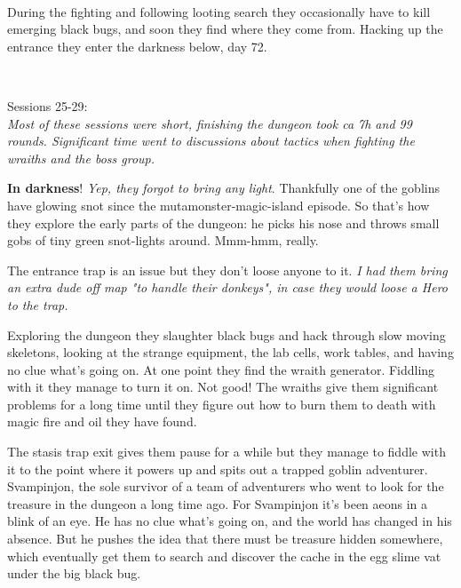 \

During the fighting and following looting search they occasionally have to kill emerging black bugs, and soon they find where they come from. Hacking up the entrance they enter the darkness below, day 72.

\


Sessions 25-29:\\                                                       %
\emph{Most of these sessions were short, finishing the dungeon took ca 7h and 99 rounds. Significant time went to discussions about tactics when fighting the wraiths and the boss group.}

\textbf{In darkness}! \emph{Yep, they forgot to bring any light}. Thankfully one of the goblins have glowing snot since the mutamonster-magic-island episode. So that's how they explore the early parts of the dungeon: he picks his nose and throws small gobs of tiny green snot-lights around. Mmm-hmm, really.

The entrance trap is an issue but they don't loose anyone to it. \emph{I had them bring an extra dude off map "to handle their donkeys", in case they would loose a Hero to the trap.}

Exploring the dungeon they slaughter black bugs and hack through slow moving skeletons, looking at the strange equipment, the lab cells, work tables, and having no clue what's going on.
At one point they find the wraith generator. Fiddling with it they manage to turn it on. Not good! The wraiths give them significant problems for a long time until they figure out how to burn them to death with magic fire and oil they have found.

The stasis trap exit gives them pause for a while but they manage to fiddle with it to the point where it powers up and spits out a trapped goblin adventurer. Svampinjon, the sole survivor of a team of adventurers who went to look for the treasure in the dungeon a long time ago. For Svampinjon it's been aeons in a blink of an eye. He has no clue what's going on, and the world has changed in his absence. But he pushes the idea that there must be treasure hidden somewhere, which eventually get them to search and discover the cache in the egg slime vat under the big black bug.

